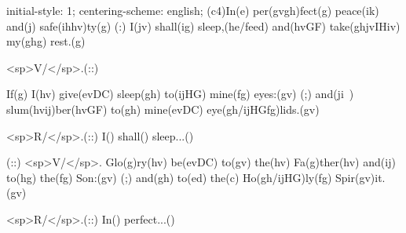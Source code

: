 initial-style: 1;
centering-scheme: english;
(c4)In(e) per(gvgh)fect(g) peace(ik) and(j) safe(ihhv)ty(g) (:) I(jv) shall(ig) sleep,(he/feed) and(hvGF) take(ghjvIHiv) my(ghg) rest.(g) 

<sp>V/</sp>.(::)

If(g) I(hv) give(evDC) sleep(gh) to(ijHG) mine(fg) eyes:(gv) (;) and(ji~) slum(hvij)ber(hvGF) to(gh) mine(evDC) eye(gh/ijHGfg)lids.(gv) 

<sp>R/</sp>.(::) I() shall() sleep...()

(::) <sp>V/</sp>. Glo(g)ry(hv) be(evDC) to(gv) the(hv) Fa(g)ther(hv) and(ij) to(hg) the(fg) Son:(gv) (;) and(gh) to(ed) the(c) Ho(gh/ijHG)ly(fg) Spir(gv)it.(gv)

<sp>R/</sp>.(::) In() perfect...()
